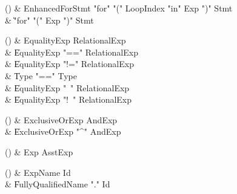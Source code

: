 \begin{bbgrammarappendix}

() & EnhancedForStmt \label{prod:EnhancedForStmt}  \: \xcd"for" \xcd"(" LoopIndex \xcd"in" Exp \xcd")" Stmt  \\

 &    \| \xcd"for" \xcd"(" Exp \xcd")" Stmt \\

\end{bbgrammarappendix}

\begin{bbgrammarappendix}

() & EqualityExp \label{prod:EqualityExp}  \: RelationalExp  \\

 &    \| EqualityExp \xcd"==" RelationalExp \\
 &    \| EqualityExp \xcd"!=" RelationalExp \\
 &    \| Type  \xcd"==" Type  \\
 &    \| EqualityExp \xcd"~" RelationalExp \\
 &    \| EqualityExp \xcd"!~" RelationalExp \\

\end{bbgrammarappendix}

\begin{bbgrammarappendix}

() & ExclusiveOrExp \label{prod:ExclusiveOrExp}  \: AndExp  \\

 &    \| ExclusiveOrExp \xcd"^" AndExp \\

\end{bbgrammarappendix}

\begin{bbgrammarappendix}

() & Exp \label{prod:Exp}  \: AsstExp  \\


\end{bbgrammarappendix}

\begin{bbgrammarappendix}

() & ExpName \label{prod:ExpName}  \: Id  \\

 &    \| FullyQualifiedName \xcd"." Id \\

\end{bbgrammarappendix}

